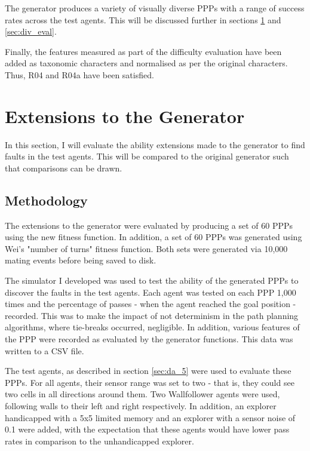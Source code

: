 \documentclass[authoryearcitations]{UoYCSproject}
\begin{document}
The generator produces a variety of visually diverse PPPs with a range of success rates across the test agents. This will be discussed further in sections \ref{sec:gen_eval} and \ref{sec:div_eval}.

Finally, the features measured as part of the difficulty evaluation have been added as taxonomic characters and normalised as per the original characters. Thus, R04 and R04a have been satisfied.

\section{Extensions to the Generator}
\label{sec:gen_eval}

In this section, I will evaluate the ability extensions made to the generator to find faults in the test agents. This will be compared to the original generator such that comparisons can be drawn.

\subsection{Methodology}
\label{sec:gen_eval_method}

The extensions to the generator were evaluated by producing a set of 60 PPPs using the new fitness function. In addition, a set of 60 PPPs was generated using Wei's "number of turns" fitness function. Both sets were generated via 10,000 mating events before being saved to disk.

The simulator I developed was used to test the ability of the generated PPPs to discover the faults in the test agents. Each agent was tested on each PPP 1,000 times and the percentage of passes - when the agent reached the goal position - recorded. This was to make the impact of not determinism in the path planning algorithms, where tie-breaks occurred, negligible. In addition, various features of the PPP were recorded as evaluated by the generator functions. This data was written to a CSV file.

The test agents, as described in section \ref{sec:da_5} were used to evaluate these PPPs. For all agents, their sensor range was set to two - that is, they could see two cells in all directions around them. Two Wallfollower agents were used, following walls to their left and right respectively. In addition, an explorer handicapped with a 5x5 limited memory and an explorer with a sensor noise of 0.1 were added, with the expectation that these agents would have lower pass rates in comparison to the unhandicapped explorer.
\end{document}
